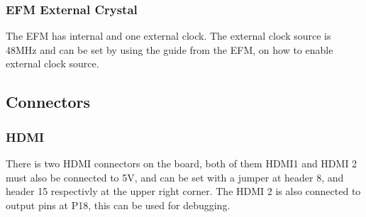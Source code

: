 \subsubsection{EFM External Crystal}
The EFM has internal and one external clock. The external clock source is 48MHz and can be set by using the guide from the EFM, on how to enable external clock source. 
\subsection{Connectors}
\subsubsection{HDMI}
There is two HDMI connectors on the board, both of them HDMI1 and HDMI 2 must also be connected to 5V, and can be set with a jumper at header 8, and header 15 respectivly at the upper right corner. The HDMI 2 is also connected to output pins at P18, this can be used for debugging.

